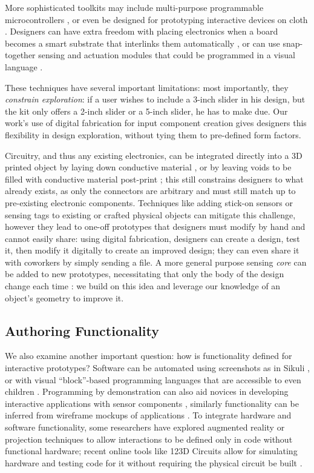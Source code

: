     More sophisticated toolkits may include multi-purpose programmable microcontrollers \cite{arduino}, or even be designed for prototyping interactive devices on cloth \cite{buechley-lilypad}. Designers can have extra freedom with placing electronics when a board becomes a smart substrate that interlinks them automatically \cite{villar-voodooio}, or can use snap-together sensing and actuation modules \cite{avrahami-switcharoo, greenberg-phidgets, lee-calder} that could be programmed in a visual language \cite{villar-gadgeteer}.
    
    These techniques have several important limitations: most importantly, they \emph{constrain exploration}: if a user wishes to include a 3-inch slider in his design, but the kit only offers a 2-inch slider or a 5-inch slider, he has to make due. Our work's use of digital fabrication for input component creation gives designers this flexibility in design exploration, without tying them to pre-defined form factors.

    Circuitry, and thus any existing electronics, can be integrated directly into a 3D printed object by laying down conductive material \cite{sells-reprap,voxel8,sarik-tracebrush}, or by leaving voids to be filled with conductive material post-print \cite{savage-sot}; this still constrains designers to what already exists, as only the connectors are arbitrary and must still match up to pre-existing electronic components. Techniques like adding stick-on sensors or sensing tags to existing or crafted physical objects \cite{maynes-aminzade-eyepatch,yeo-stickear} can mitigate this challenge, however they lead to one-off prototypes that designers must modify by hand and cannot easily share: using digital fabrication, designers can create a design, test it, then modify it digitally to create an improved design; they can even share it with coworkers by simply sending a file. A more general purpose sensing \emph{core} can be added to new prototypes, necessitating that only the body of the design change each time \cite{doering-composition}: we build on this idea and leverage our knowledge of an object's geometry to improve it.

    \subsection{Authoring Functionality}
    We also examine another important question: how is functionality defined for interactive prototypes? Software can be automated using screenshots as in Sikuli \cite{yeh-sikuli}, or with visual ``block''-based programming languages that are accessible to even children \cite{resnick-scratch}. Programming by demonstration can also aid novices in developing interactive applications with sensor components \cite{hartmann-dtools}, similarly functionality can be inferred from wireframe mockups of applications \cite{li-framewire}. To integrate hardware and software functionality, some researchers have explored augmented reality \cite{nam-AR} or projection \cite{akaoka-displayobjects} techniques to allow interactions to be defined only in code without functional hardware; recent online tools like 123D Circuits allow for simulating hardware and testing code for it without requiring the physical circuit be built \cite{123dcircuits}.


